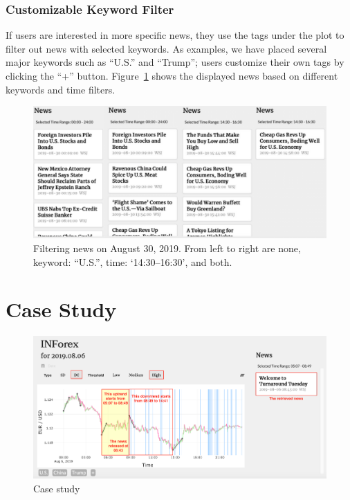 \documentclass[sigconf]{acmart}
\begin{document}
\subsubsection{Customizable Keyword Filter
}
If users are interested in more specific news, they use the tags under the
plot to filter out news with selected keywords.
As examples, we have placed several major keywords such as ``U.S.'' and ``Trump'';
users customize their own tags by clicking the ``+'' button.
Figure~\ref{fig:keywords} shows the displayed news based on different keywords
and time filters. 

\begin{figure}[h]
  \centering
  \includegraphics[width=\linewidth]{news.pdf}
  \caption{Filtering news on August 30, 2019. From left to right
  are none, keyword: ``U.S.'', time: `14:30--16:30', and both.}
  \Description{}
  \label{fig:keywords}
\end{figure}

\section{Case Study}\label{sec:case}

\begin{figure}[h]
  \centering
  \includegraphics[width=\linewidth]{case.pdf}
  \caption{Case study}
  \Description{}
  \label{fig:case}
\end{figure}
\end{document}
